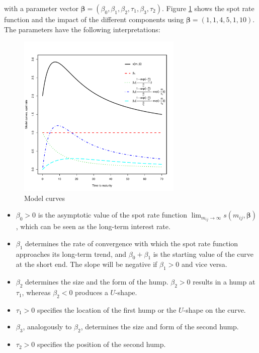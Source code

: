 with a parameter vector ${\bm{\beta}} = \left(\beta_0,\beta_1,\beta_2,\tau_1,\beta_3,\tau_2\right)$. Figure \ref{fig:modelcurves} shows the \cite{Svensson1994} spot rate function and the impact of the different components using $\bm{\beta} = (1, 1, 4, 5, 1, 10)$. The parameters have the following interpretations:

%

\begin{figure}[htb]
\centering
  \caption{Model curves}
 \label{fig:modelcurves}
\includegraphics[width=0.7\textwidth]{curveshape}
\end{figure}

\begin{itemize}
\item $\beta_0>0$ is the asymptotic value of the spot rate function $\lim_{m_{ij}\to\infty}s(m_{ij},\bm{\beta})$, which can be seen as the long-term interest rate.
\item $\beta_1$ determines the rate of convergence with which the spot rate function approaches its long-term trend, and $\beta_0+\beta_1$ is the starting value of the curve at the short end. The slope will be negative if $\beta_1>0$ and vice versa.
\item $\beta_2$ determines the size and the form of the hump. $\beta_2 >0$  results in a hump at  $\tau_1$, whereas $\beta_2<0$ produces a $U$-shape.
\item $\tau_1>0$ specifies the location of the first hump or the $U$-shape on the curve.
\item $\beta_3$, analogously to $\beta_2$, determines the size and form of the second hump.
\item $\tau_2>0$ specifies the position of the second hump.
\end{itemize}

